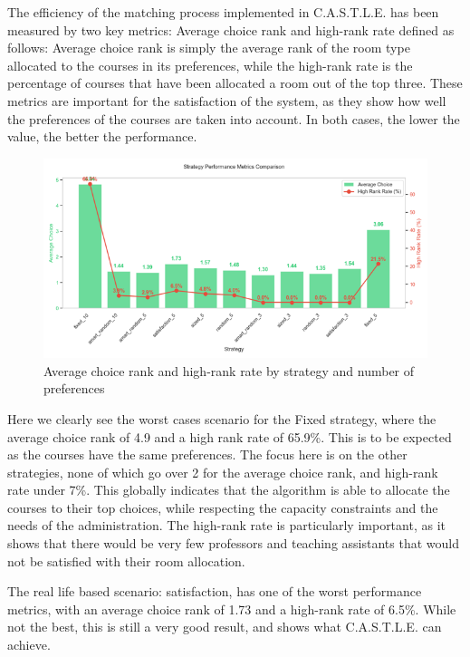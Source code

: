 \documentclass[a4paper, oneside]{article}
\theoremstyle{plain}
\newcommand{\castle}{C{\small.}A{\small.}S{\small.}T{\small.}L{\small.}E{\small.}}
\begin{document}
The efficiency of the matching process implemented in \castle{} has been measured by two key metrics: Average choice rank and high-rank rate defined as follows: Average choice rank is simply the average rank
of the room type allocated to the courses in its preferences, while the high-rank rate is the percentage of courses that have been allocated a room out of the top three. These metrics are important for the
satisfaction of the system, as they show how well the preferences of the courses are taken into account. In both cases, the lower the value, the better the performance.

\begin{figure}[H]
	\centering
	\includegraphics[scale = 0.8]{images/performance_metrics.png}
	\caption{Average choice rank and high-rank rate by strategy and number of preferences}
\end{figure}

Here we clearly see the worst cases scenario for the Fixed strategy, where the average choice rank of 4.9 and a high rank rate of 65.9\%. This is to be expected as the courses have the same preferences.
The focus here is on the other strategies, none of which go over 2 for the average choice rank, and high-rank rate under 7\%. This globally indicates that the algorithm is able to allocate the courses
to their top choices, while respecting the capacity constraints and the needs of the administration. The high-rank rate is particularly important, as it shows that there would be very few professors and 
teaching assistants that would not be satisfied with their room allocation.

The real life based scenario: satisfaction, has one of the worst performance metrics, with an average choice rank of 1.73 and a high-rank rate of 6.5\%. While not the best, this is still a very good result,
and shows what \castle{} can achieve.
\end{document}
